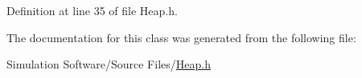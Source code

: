 Definition at line 35 of file Heap.\+h.



The documentation for this class was generated from the following file\+:\begin{DoxyCompactItemize}
\item 
Simulation Software/\+Source Files/\hyperlink{_heap_8h}{Heap.\+h}\end{DoxyCompactItemize}
